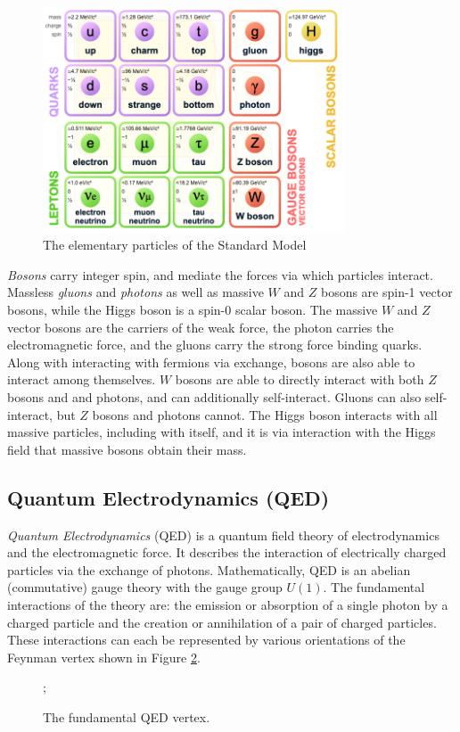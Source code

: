 \begin{figure}[h]
    \centering
    \includegraphics[width=0.8\textwidth]{Figures/1/sm.png}
    \caption{The elementary particles of the Standard Model}
    \label{fig:standardmodel}
\end{figure}

\textit{Bosons} carry integer spin, and mediate the forces via which particles interact. Massless \textit{gluons} and \textit{photons} as well as massive $W$ and $Z$ bosons are spin-1 vector bosons, while the Higgs boson is a spin-0 scalar boson. The massive $W$ and $Z$ vector bosons are the carriers of the weak force, the photon carries the electromagnetic force, and the gluons carry the strong force binding quarks. Along with interacting with fermions via exchange, bosons are also able to interact among themselves. $W$ bosons are able to directly interact with both $Z$ bosons and and photons, and can additionally self-interact. Gluons can also self-interact, but $Z$ bosons and photons cannot. The Higgs boson interacts with all massive particles, including with itself, and it is via interaction with the Higgs field that massive bosons obtain their mass.

\subsection{Quantum Electrodynamics (QED)}
\textit{Quantum Electrodynamics} (QED) \cite{Feynman, schwartz, peskin} is a quantum field theory of electrodynamics and the electromagnetic force. It describes the interaction of electrically charged particles via the exchange of photons. Mathematically, QED is an abelian (commutative) gauge theory with the gauge group $U(1)$. The fundamental interactions of the theory are: the emission or absorption of a single photon by a charged particle and the creation or annihilation of a pair of charged particles. These interactions can each be represented by various orientations of the Feynman vertex shown in Figure \ref{fig:QEDvertex}.
\begin{figure}[h!]
    \centering
    ;
    \caption{The fundamental QED vertex.}
    \label{fig:QEDvertex}
\end{figure}


